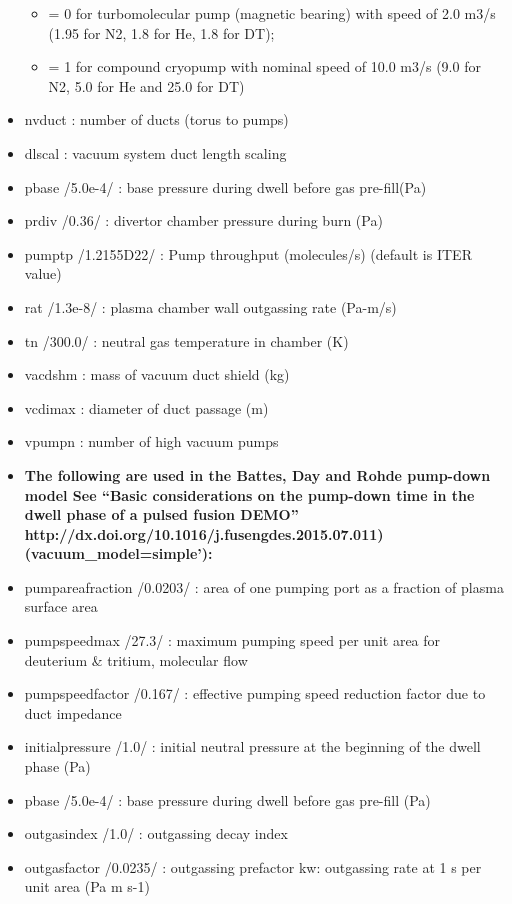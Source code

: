 \documentclass[]{article}
\providecommand{\tightlist}{%
  \setlength{\itemsep}{0pt}\setlength{\parskip}{0pt}}
\begin{document}
\begin{itemize}
  \begin{itemize}
  \tightlist
  \item
    = 0 for turbomolecular pump (magnetic bearing) with speed of 2.0
    m3/s (1.95 for N2, 1.8 for He, 1.8 for DT);
  \item
    = 1 for compound cryopump with nominal speed of 10.0 m3/s (9.0 for
    N2, 5.0 for He and 25.0 for DT)
  \end{itemize}
\item
  nvduct : number of ducts (torus to pumps)
\item
  dlscal : vacuum system duct length scaling
\item
  pbase /5.0e-4/ : base pressure during dwell before gas pre-fill(Pa)
\item
  prdiv /0.36/ : divertor chamber pressure during burn (Pa)
\item
  pumptp /1.2155D22/ : Pump throughput (molecules/s) (default is ITER
  value)
\item
  rat /1.3e-8/ : plasma chamber wall outgassing rate (Pa-m/s)
\item
  tn /300.0/ : neutral gas temperature in chamber (K)
\item
  vacdshm : mass of vacuum duct shield (kg)
\item
  vcdimax : diameter of duct passage (m)
\item
  vpumpn : number of high vacuum pumps
\item
  \textbf{The following are used in the Battes, Day and Rohde pump-down
  model See ``Basic considerations on the pump-down time in the dwell
  phase of a pulsed fusion DEMO''
  http://dx.doi.org/10.1016/j.fusengdes.2015.07.011)
  (vacuum\_model=simple'):}
\item
  pumpareafraction /0.0203/ : area of one pumping port as a fraction of
  plasma surface area
\item
  pumpspeedmax /27.3/ : maximum pumping speed per unit area for
  deuterium \& tritium, molecular flow
\item
  pumpspeedfactor /0.167/ : effective pumping speed reduction factor due
  to duct impedance
\item
  initialpressure /1.0/ : initial neutral pressure at the beginning of
  the dwell phase (Pa)
\item
  pbase /5.0e-4/ : base pressure during dwell before gas pre-fill (Pa)
\item
  outgasindex /1.0/ : outgassing decay index
\item
  outgasfactor /0.0235/ : outgassing prefactor kw: outgassing rate at 1
  s per unit area (Pa m s-1)
\end{itemize}
\end{document}
